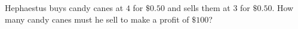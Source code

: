 Hephaestus buys candy canes at $4$ for $\$0.50$ and sells them at $3$ for $\$0.50$. How many candy canes must he sell to make a profit of $\$100$?
